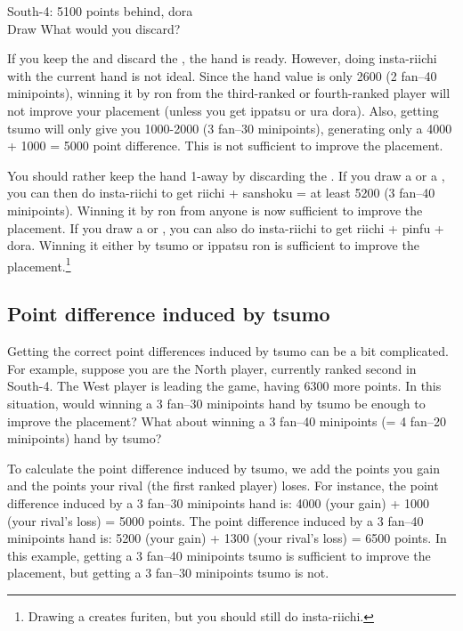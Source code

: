 \bigskip
\begin{itembox}[r]{South-4: 5100 points behind, {\jap dora} {\large{}}}
\bp
{}~~\\
\hspace{298pt}\footnotesize{Draw}
\ep
\vspace{-17pt}
What would you discard?
\end{itembox}
\noindent If you keep the {\large{}} and discard the {\large{}}, the hand is ready. However, doing insta-{\jap riichi} with the current hand is not ideal. Since the hand value is only 2600 (2 {\jap fan}--40 minipoints), winning it by {\jap ron} from the third-ranked or fourth-ranked player will not improve your placement (unless you get {\jap ippatsu} or {\jap ura dora}). Also, getting {\jap tsumo} will only give you 1000-2000 (3 {\jap fan}--30 minipoints), generating only a 4000 + 1000 = 5000 point difference. This is not sufficient to improve the placement. 

\bigskip
You should rather keep the hand 1-away by discarding the {\large{}}. If you draw a {\large{}} or a {\large{}}, you can then do insta-{\jap riichi} to get {\jap riichi} + {\jap sanshoku} = at least 5200 (3 {\jap fan}--40 minipoints). Winning it by {\jap ron} from anyone is now sufficient to improve the placement. If you draw a {\large{}} or {\large{}}, you can also do insta-{\jap riichi} to get {\jap riichi} + {\jap pinfu} + {\jap dora}. Winning it either by {\jap tsumo} or {\jap ippatsu ron} is sufficient to improve the placement.\footnote{Drawing a  creates {\jap furiten}, but you should still do insta-{\jap riichi}.}

\subsection*{Point difference induced by {\jap tsumo}}
Getting the correct point differences induced by {\jap tsumo} can be a bit complicated. For example, suppose you are the North player, currently ranked second in South-4. The West player is leading the game, having 6300 more points. In this situation, would winning a 3 {\jap fan}--30 minipoints hand by {\jap tsumo} be enough to improve the placement? What about winning a 3 {\jap fan}--40 minipoints (= 4 {\jap fan}--20 minipoints) hand by {\jap tsumo}? 

\bigskip
To calculate the point difference induced by {\jap tsumo}, we add the points you gain and the points your rival (the first ranked player) loses. For instance, the point difference induced by a 3 {\jap fan}--30 minipoints hand is: 4000 (your gain) + 1000 (your rival's loss) = 5000 points. The point difference induced by a 3 {\jap fan}--40 minipoints hand is: 5200 (your gain) + 1300 (your rival's loss) = 6500 points. 
In this example, getting a 3 {\jap fan}--40 minipoints {\jap tsumo} is sufficient to improve the placement, but getting a 3 {\jap fan}--30 minipoints {\jap tsumo} is not. 

